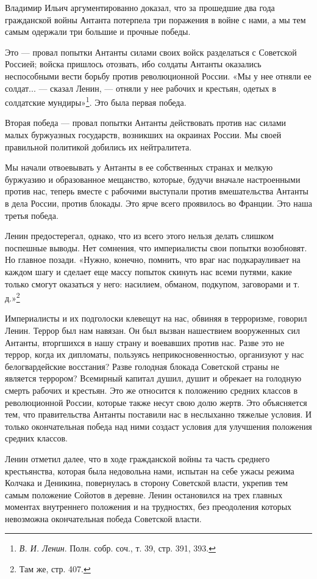\documentclass[12pt, a4paper, openany]{book}
\begin{document}
Владимир Ильич аргументированно доказал, что за прошедшие два года гражданской войны Антанта потерпела три поражения в войне с нами, а мы тем самым одержали три большие и прочные победы.

Это — провал попытки Антанты силами своих войск разделаться с Советской Россией; войска пришлось отозвать, ибо солдаты Антанты оказались неспособными вести борьбу против революционной России. «Мы у нее отняли ее солдат... — сказал Ленин, — отняли у нее рабочих и крестьян, одетых в солдатские мундиры»\footnote{\textit{В. И. Ленин}. Полн. собр. соч., т. 39, стр. 391, 393.}. Это была первая победа.

Вторая победа — провал попытки Антанты действовать против нас силами малых буржуазных государств, возникших на окраинах России. Мы своей правильной политикой добились их нейтралитета.

Мы начали отвоевывать у Антанты в ее собственных странах и мелкую буржуазию и образованное мещанство, которые, будучи вначале настроенными против нас, теперь вместе с рабочими выступали против вмешательства Антанты в дела России, против блокады. Это ярче всего проявилось во Франции. Это наша третья победа.

Ленин предостерегал, однако, что из всего этого нельзя делать слишком поспешные выводы. Нет сомнения, что империалисты свои попытки возобновят. Но главное позади. «Нужно, конечно, помнить, что враг нас подкарауливает на каждом шагу и сделает еще массу попыток скинуть нас всеми путями, какие только смогут оказаться у него: насилием, обманом, подкупом, заговорами и т. д.»\footnote{Там же, стр. 407.}

Империалисты и их подголоски клевещут на нас, обвиняя в терроризме, говорил Ленин. Террор был нам навязан. Он был вызван нашествием вооруженных сил Антанты, вторгшихся в нашу страну и воевавших против нас. Разве это не террор, когда их дипломаты, пользуясь неприкосновенностью, организуют у нас белогвардейские восстания? Разве голодная блокада Советской страны не является террором? Всемирный капитал душил, душит и обрекает на голодную смерть рабочих и крестьян. Это же относится к положению средних классов в революционной России, которые также несут свою долю жертв. Это объясняется тем, что правительства Антанты поставили нас в неслыханно тяжелые условия. И только окончательная победа над ними создаст условия для улучшения положения средних классов.

Ленин отметил далее, что в ходе гражданской войны та часть среднего крестьянства, которая была недовольна нами, испытан на себе ужасы режима Колчака и Деникина, повернулась в сторону Советской власти, укрепив тем самым положение Сойотов в деревне. Ленин остановился на трех главных моментах внутреннего положения и на трудностях, без преодоления которых невозможна окончательная победа Советской власти.
\end{document}
